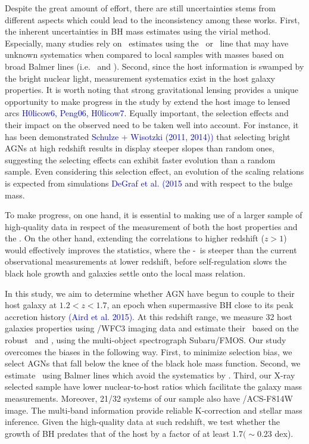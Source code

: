 \documentclass[apj]{emulateapj}
\begin{document}
Despite the great amount of effort, there are still uncertainties stems from different aspects which could lead to the inconsistency among these works. First, the inherent uncertainties in BH mass estimates using the virial method. Especially, many studies rely on \mbh\ estimates using the \Mgii\ or \Civ\ line that may have unknown systematics when compared to local samples with masses based on broad Balmer lines (i.e. \halpha\ and \hbeta). Second, since the host information is swamped by the bright nuclear light, measurement systematics exist in the host galaxy properties. It is worth noting that strong gravitational lensing provides a unique opportunity to make progress in the study by extend the host image to lensed arcs \textcolor{blue}{H0licow6, Peng06, H0licow7}. Equally important,
the selection effects and their impact on the observed need to be taken well into account. For instance, it has been demonstrated \textcolor{blue}{Schulze + Wisotzki (2011, 2014))} that selecting bright AGNs at high redshift results in display steeper slopes than random ones, suggesting the selecting effects can exhibit faster evolution than a random sample. Even considering this selection effect, an evolution of the scaling relations is expected from simulations \textcolor{blue}{DeGraf et al. (2015} and with respect to the bulge mass.

To make progress, on one hand, it is essential to making use of a larger sample of high-quality data in respect of the measurement of both the host properties and the \mbh. On the other hand, extending the correlations to higher redshift ($z>1$) would effectively improves the statistics, where the \mbh-\lhost\ is steeper than the current observational measurements at lower redshift, before self-regulation slows the black hole growth and galaxies settle onto the local mass relation.

In this study, we aim to determine whether AGN have begun to couple to their host galaxy at $1.2<z<1.7$, an epoch when supermassive BH close to its peak accretion history \textcolor{blue}{(Aird et al. 2015)}.  At this redshift range, we measure 32 host galaxies properties using \hst/WFC3 imaging data and estimate their \mbh\ based on the robust \halpha\ and \hbeta, using the multi-object spectrograph Subaru/FMOS. Our study overcomes the biases in the following way. First, to minimize selection bias, we select AGNs that fall below the knee of the black hole mass function. Second, we estimate \mbh\ using Balmer lines which avoid the systematics by \Mgii. Third, our X-ray selected sample have lower nuclear-to-host ratios which facilitate the galaxy mass measurements. Moreover, 21/32 systems of our sample also have \hst/ACS-F814W image. The multi-band information provide reliable K-correction and stellar mass inference. Given the high-quality data at such redshift, we test whether the growth of BH predates that of the host by a factor of at least $1.7 (\sim0.23$ dex). 
\end{document}
